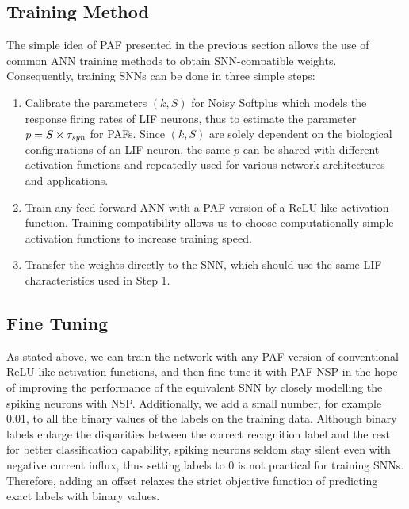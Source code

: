 	\subsection{Training Method}
	\label{subsec:ns_train}
	
	The simple idea of PAF presented in the previous section allows the use of common ANN training methods to obtain SNN-compatible weights.
	Consequently, training SNNs can be done in three simple steps: 
	\begin{enumerate}
		\item Calibrate the parameters $(k, S)$ for Noisy Softplus which models the response firing rates of LIF neurons, thus to estimate the parameter $p=S \times \tau_{\textit{\textrm{syn}}}$ for PAFs. Since $(k, S)$ are solely dependent on the biological configurations of an LIF neuron, the same $p$ can be shared with different activation functions and repeatedly used for various network architectures and applications.
		\item Train any feed-forward ANN with a PAF version of a ReLU-like activation function.
		Training compatibility allows us to choose computationally simple activation functions to increase training speed.
		\item Transfer the weights directly to the SNN, which should use the same LIF characteristics used in Step 1.
	\end{enumerate}
	
	\subsection{Fine Tuning}
	\label{subsec:finetune}
	As stated above, we can train the network with any PAF version of conventional ReLU-like activation functions, and then fine-tune it with PAF-NSP in the hope of improving the performance of the equivalent SNN by closely modelling the spiking neurons with NSP.
	Additionally, we add a small number, for example 0.01, to all the binary values of the labels on the training data.
	Although binary labels enlarge the disparities between the correct recognition label and the rest for better classification capability, 
	spiking neurons seldom stay silent even with negative current influx, thus setting labels to 0 is not practical for training SNNs.
	Therefore, adding an offset relaxes the strict objective function of predicting exact labels with binary values.
	
